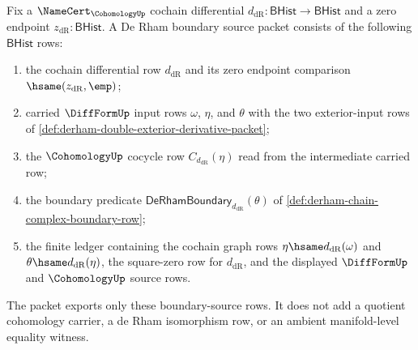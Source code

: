 \begin{definition}
\label{def:derham-boundary-source-packet}
Fix a $\NameCert_{\CohomologyUp}$ cochain differential
$d_{\mathrm{dR}}:\mathsf{BHist}\to\mathsf{BHist}$ and a zero endpoint
$z_{\mathrm{dR}}:\mathsf{BHist}$. A De Rham boundary source packet consists of
the following $\mathsf{BHist}$ rows:
\begin{enumerate}
  \item the cochain differential row $d_{\mathrm{dR}}$ and its zero endpoint
  comparison $\hsame(z_{\mathrm{dR}},\emp)$;
  \item carried $\DiffFormUp$ input rows $\omega$, $\eta$, and $\theta$ with
  the two exterior-input rows of
  \autoref{def:derham-double-exterior-derivative-packet};
  \item the $\CohomologyUp$ cocycle row $C_{d_{\mathrm{dR}}}(\eta)$ read from
  the intermediate carried row;
  \item the boundary predicate
  $\mathsf{DeRhamBoundary}_{d_{\mathrm{dR}}}(\theta)$ of
  \autoref{def:derham-chain-complex-boundary-row};
  \item the finite ledger containing the cochain graph rows
  $\eta\hsame d_{\mathrm{dR}}(\omega)$ and
  $\theta\hsame d_{\mathrm{dR}}(\eta)$, the square-zero row for
  $d_{\mathrm{dR}}$, and the displayed $\DiffFormUp$ and $\CohomologyUp$
  source rows.
\end{enumerate}
The packet exports only these boundary-source rows. It does not add a quotient
cohomology carrier, a de Rham isomorphism row, or an ambient manifold-level
equality witness.
\end{definition}

